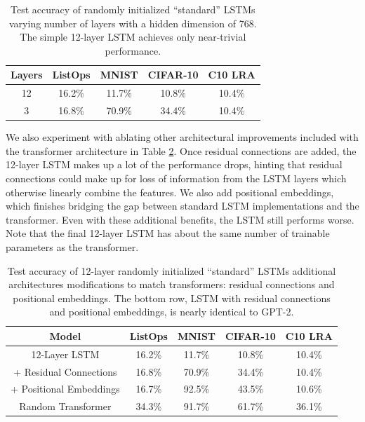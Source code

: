 \begin{table}[h] 
\begin{center}
\begin{tabular}{c|cccc}
\toprule
\textbf{Layers} & \multicolumn{1}{c}{\bf ListOps} & \multicolumn{1}{c}{\bf MNIST} & \multicolumn{1}{c}{\bf CIFAR-10} & \multicolumn{1}{c}{\bf C10 LRA} \\
\midrule
12 & 16.2\% & 11.7\% & 10.8\% & 10.4\% \\
3  & 16.8\% & 70.9\% & 34.4\% & 10.4\% \\
\bottomrule
\end{tabular}
\end{center}
\caption{Test accuracy of randomly initialized ``standard'' LSTMs varying number of layers with a hidden dimension of 768. The simple 12-layer LSTM achieves only near-trivial performance.}\label{table:lstm_layers}
\end{table}
\vspace{-.5em}

We also experiment with ablating other architectural improvements included with the transformer architecture in Table \ref{table:lstm_layers_residual}.
Once residual connections \citep{he2016resnet} are added, the 12-layer LSTM makes up a lot of the performance drops, hinting that residual connections could make up for loss of information from the LSTM layers which otherwise linearly combine the features.
We also add positional embeddings, which finishes bridging the gap between standard LSTM implementations and the transformer.
Even with these additional benefits, the LSTM still performs worse.
Note that the final 12-layer LSTM has about the same number of trainable parameters as the transformer.

\begin{table}[h] 
\begin{center}
\begin{tabular}{c|cccc}
\toprule
\textbf{Model} & \multicolumn{1}{c}{\bf ListOps} & \multicolumn{1}{c}{\bf MNIST} & \multicolumn{1}{c}{\bf CIFAR-10} & \multicolumn{1}{c}{\bf C10 LRA} \\
\midrule
12-Layer LSTM           & 16.2\% & 11.7\% & 10.8\% & 10.4\% \\
+ Residual Connections  & 16.8\% & 70.9\% & 34.4\% & 10.4\% \\
+ Positional Embeddings & 16.7\% & 92.5\% & 43.5\% & 10.6\% \\
\midrule
Random Transformer      & 34.3\% & 91.7\% & 61.7\% & 36.1\% \\
\bottomrule
\end{tabular}
\end{center}
\caption{Test accuracy of 12-layer randomly initialized ``standard'' LSTMs additional architectures modifications to match transformers: residual connections and positional embeddings.
The bottom row, LSTM with residual connections and positional embeddings, is nearly identical to GPT-2.}\label{table:lstm_layers_residual}
\end{table}


